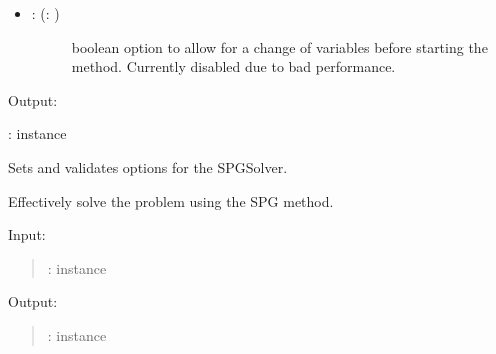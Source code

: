 \documentclass[a4paper,10pt,english]{sphinxmanual}
\begin{document}
\begin{fulllineitems}
\begin{description}
\begin{itemize}
\begin{description}
\end{description}

\item {} \begin{description}
\item[{: (: )}] \leavevmode
boolean option to allow for a change of variables before starting the 
method. Currently disabled due to bad performance.

\end{description}

\end{itemize}

\end{description}

Output:

:  instance

\begin{fulllineitems}
\label{\detokenize{skprocrustes:skprocrustes.SPGSolver._setoptions}}
Sets and validates options for the SPGSolver.


\end{fulllineitems}


\begin{fulllineitems}
\label{\detokenize{skprocrustes:skprocrustes.SPGSolver.solve}}
Effectively solve the problem using the SPG method.

Input:
\begin{quote}

:  instance
\end{quote}

Output:
\begin{quote}

:  instance
\end{quote}

\end{fulllineitems}


\end{fulllineitems}
\end{document}
